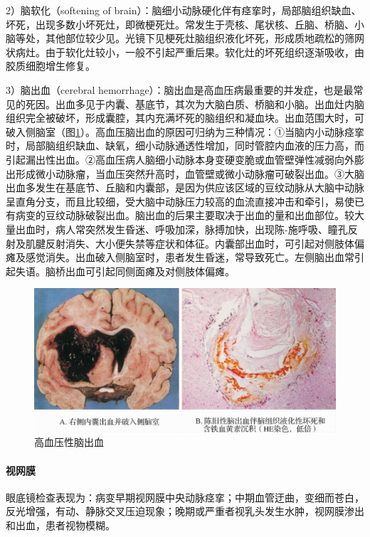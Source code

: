 2）脑软化（softening of
brain）：脑细小动脉硬化伴有痉挛时，局部脑组织缺血、坏死，出现多数小坏死灶，即微梗死灶。常发生于壳核、尾状核、丘脑、桥脑、小脑等处，其他部位较少见。光镜下见梗死灶脑组织液化坏死，形成质地疏松的筛网状病灶。由于软化灶较小，一般不引起严重后果。软化灶的坏死组织逐渐吸收，由胶质细胞增生修复。

3）脑出血（cerebral
hemorrhage）：脑出血是高血压病最重要的并发症，也是最常见的死因。出血多见于内囊、基底节，其次为大脑白质、桥脑和小脑。出血灶内脑组织完全被破坏，形成囊腔，其内充满坏死的脑组织和凝血块。出血范围大时，可破入侧脑室（图\ref{fig6-9}）。高血压脑出血的原因可归纳为三种情况：①当脑内小动脉痉挛时，局部脑组织缺血、缺氧，细小动脉通透性增加，同时管腔内血液的压力高，而引起漏出性出血。②高血压病人脑细小动脉本身变硬变脆或血管壁弹性减弱向外膨出形成微小动脉瘤，当血压突然升高时，血管壁或微小动脉瘤可破裂出血。③大脑出血多发生在基底节、丘脑和内囊部，是因为供应该区域的豆纹动脉从大脑中动脉呈直角分支，而且比较细，受大脑中动脉压力较高的血流直接冲击和牵引，易使已有病变的豆纹动脉破裂出血。脑出血的后果主要取决于出血的量和出血部位。较大量出血时，病人常突然发生昏迷、呼吸加深，脉搏加快，出现陈-施呼吸、瞳孔反射及肌腱反射消失、大小便失禁等症状和体征。内囊部出血时，可引起对侧肢体偏瘫及感觉消失。出血破入侧脑室时，患者发生昏迷，常导致死亡。左侧脑出血常引起失语。脑桥出血可引起同侧面瘫及对侧肢体偏瘫。

\begin{figure}[!htbp]
    \centering
    \includegraphics{./images/Image00101.jpg}
    \captionsetup{justification=centering}
    \caption{高血压性脑出血}
    \label{fig6-9}
\end{figure}

\paragraph{视网膜}
眼底镜检查表现为：病变早期视网膜中央动脉痉挛；中期血管迂曲，变细而苍白，反光增强，有动、静脉交叉压迫现象；晚期或严重者视乳头发生水肿，视网膜渗出和出血，患者视物模糊。

